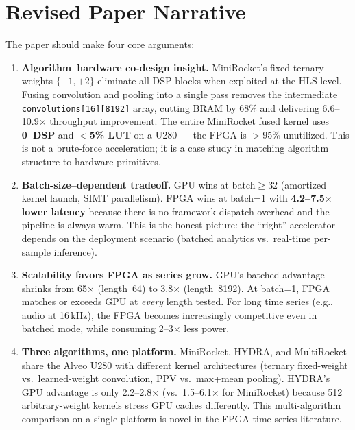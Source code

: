 \documentclass[11pt]{article}
\begin{document}
\section{Revised Paper Narrative}

The paper should make four core arguments:

\begin{enumerate}[leftmargin=*]

\item \textbf{Algorithm--hardware co-design insight.}
MiniRocket's fixed ternary weights $\{-1, +2\}$ eliminate all DSP blocks
when exploited at the HLS level. Fusing convolution and pooling into a single
pass removes the intermediate \texttt{convolutions[16][8192]} array, cutting
BRAM by 68\% and delivering 6.6--10.9$\times$ throughput improvement.
The entire MiniRocket fused kernel uses \textbf{0~DSP} and \textbf{$<$5\% LUT}
on a U280 --- the FPGA is $>$95\% unutilized.
This is not a brute-force acceleration; it is a case study in matching
algorithm structure to hardware primitives.

\item \textbf{Batch-size--dependent tradeoff.}
GPU wins at batch$\geq$32 (amortized kernel launch, SIMT parallelism).
FPGA wins at batch=1 with \textbf{4.2--7.5$\times$ lower latency} because
there is no framework dispatch overhead and the pipeline is always warm.
This is the honest picture: the ``right'' accelerator depends on the
deployment scenario (batched analytics vs.\ real-time per-sample inference).

\item \textbf{Scalability favors FPGA as series grow.}
GPU's batched advantage shrinks from 65$\times$ (length~64) to 3.8$\times$ (length~8192).
At batch=1, FPGA matches or exceeds GPU at \emph{every} length tested.
For long time series (e.g., audio at 16\,kHz), the FPGA becomes increasingly competitive
even in batched mode, while consuming 2--3$\times$ less power.

\item \textbf{Three algorithms, one platform.}
MiniRocket, HYDRA, and MultiRocket share the Alveo U280 with different
kernel architectures (ternary fixed-weight vs.\ learned-weight convolution,
PPV vs.\ max+mean pooling). HYDRA's GPU advantage is only 2.2--2.8$\times$
(vs.\ 1.5--6.1$\times$ for MiniRocket) because 512 arbitrary-weight kernels
stress GPU caches differently. This multi-algorithm comparison on a single
platform is novel in the FPGA time series literature.

\end{enumerate}
\end{document}
